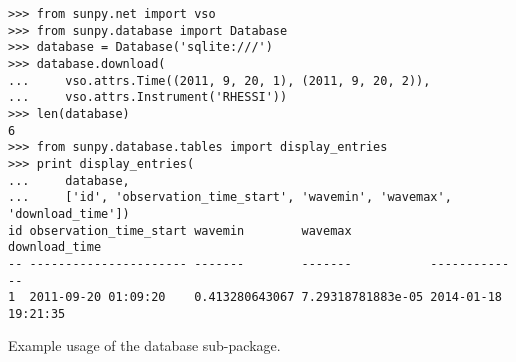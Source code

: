 \begin{listing}[H]
\begin{verbatim}
>>> from sunpy.net import vso
>>> from sunpy.database import Database
>>> database = Database('sqlite:///')
>>> database.download(
...     vso.attrs.Time((2011, 9, 20, 1), (2011, 9, 20, 2)),
...     vso.attrs.Instrument('RHESSI'))
>>> len(database)
6
>>> from sunpy.database.tables import display_entries
>>> print display_entries(
...     database,
...     ['id', 'observation_time_start', 'wavemin', 'wavemax', 'download_time'])
id observation_time_start wavemin        wavemax           download_time      
-- ---------------------- -------        -------           -------------      
1  2011-09-20 01:09:20    0.413280643067 7.29318781883e-05 2014-01-18 19:21:35

\end{verbatim}
\caption{Example usage of the database sub-package.}
\label{code:database}
\end{listing}
